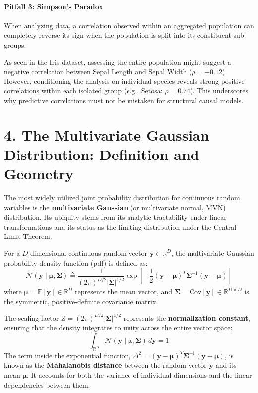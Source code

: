 \documentclass{article}
\begin{document}
\paragraph{Pitfall 3: Simpson's Paradox}
When analyzing data, a correlation observed within an aggregated population can completely reverse its sign when the population is split into its constituent sub-groups. 

As seen in the Iris dataset, assessing the entire population might suggest a negative correlation between Sepal Length and Sepal Width ($\rho = -0.12$). However, conditioning the analysis on individual species reveals strong positive correlations within each isolated group (e.g., Setosa: $\rho = 0.74$). This underscores why predictive correlations must not be mistaken for structural causal models.

\section*{4. The Multivariate Gaussian Distribution: Definition and Geometry}

The most widely utilized joint probability distribution for continuous random variables is the \textbf{multivariate Gaussian} (or multivariate normal, MVN) distribution. Its ubiquity stems from its analytic tractability under linear transformations and its status as the limiting distribution under the Central Limit Theorem.

For a $D$-dimensional continuous random vector $\mathbf{y} \in \mathbb{R}^D$, the multivariate Gaussian probability density function (pdf) is defined as:
\begin{equation}
\mathcal{N}(\mathbf{y} \mid \boldsymbol{\mu}, \boldsymbol{\Sigma}) \triangleq \frac{1}{(2\pi)^{D/2}|\boldsymbol{\Sigma}|^{1/2}} \exp \left[ -\frac{1}{2}(\mathbf{y} - \boldsymbol{\mu})^T \boldsymbol{\Sigma}^{-1}(\mathbf{y} - \boldsymbol{\mu}) \right] \tag{8}
\end{equation}
where $\boldsymbol{\mu} = \mathbb{E}[\mathbf{y}] \in \mathbb{R}^D$ represents the mean vector, and $\boldsymbol{\Sigma} = \text{Cov}[\mathbf{y}] \in \mathbb{R}^{D \times D}$ is the symmetric, positive-definite covariance matrix. 

The scaling factor $Z = (2\pi)^{D/2}|\boldsymbol{\Sigma}|^{1/2}$ represents the \textbf{normalization constant}, ensuring that the density integrates to unity across the entire vector space:
\begin{equation*}
\int_{\mathbb{R}^D} \mathcal{N}(\mathbf{y} \mid \boldsymbol{\mu}, \boldsymbol{\Sigma}) \, d\mathbf{y} = 1
\end{equation*}
The term inside the exponential function, $\Delta^2 = (\mathbf{y} - \boldsymbol{\mu})^T \boldsymbol{\Sigma}^{-1}(\mathbf{y} - \boldsymbol{\mu})$, is known as the \textbf{Mahalanobis distance} between the random vector $\mathbf{y}$ and its mean $\boldsymbol{\mu}$. It accounts for both the variance of individual dimensions and the linear dependencies between them.
\end{document}
